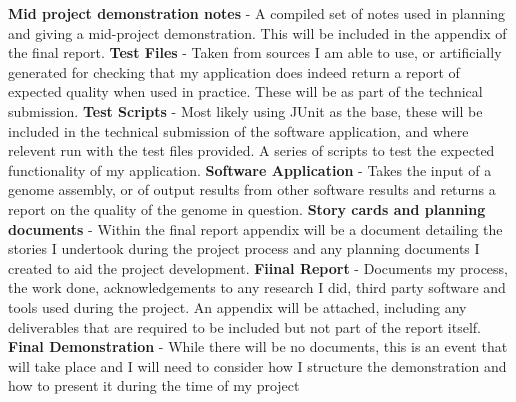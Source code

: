 \documentclass[11pt,fleqn,twoside]{article}
\begin{document}
\textbf{Mid project demonstration notes} - A compiled set of notes used in planning and giving a mid-project demonstration. This will be included in the appendix of the final report.
\newline
\noindent
\textbf{Test Files} - Taken from sources I am able to use, or artificially generated for checking that my application does indeed return a report of expected quality when used in practice. These will be as part of the technical submission.
\newline
\noindent
\textbf{Test Scripts} - Most likely using JUnit as the base, these will be included in the technical submission of the software application, and where relevent run with the test files provided. A series of scripts to test the expected functionality of my application.
\newline
\noindent
\textbf{Software Application} - Takes the input of a genome assembly, or of output results from other software results and returns a report on the quality of the genome in question.
\newline
\noindent
\textbf{Story cards and planning documents} - Within the final report appendix will be a document detailing the stories I undertook during the project process and any planning documents I created to aid the project development.
\newline
\noindent
\textbf{Fiinal Report} -  Documents my process, the work done, acknowledgements to any research I did, third party software and tools used during the project. An appendix will be attached, including any deliverables that are required to be included but not part of the report itself.
\newline
\noindent
\textbf{Final Demonstration} - While there will be no documents, this is an event that will take place and I will need to consider how I structure the demonstration and how to present it during the time of my project

%
%
%
\end{document}

